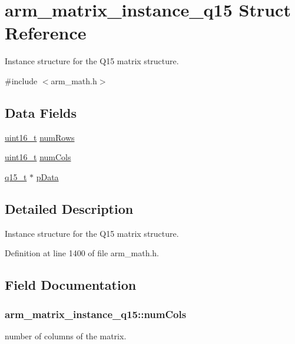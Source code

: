 \hypertarget{structarm__matrix__instance__q15}{\section{arm\-\_\-matrix\-\_\-instance\-\_\-q15 Struct Reference}
\label{structarm__matrix__instance__q15}
}


Instance structure for the Q15 matrix structure.  




{\ttfamily \#include $<$arm\-\_\-math.\-h$>$}

\subsection*{Data Fields}
\begin{DoxyCompactItemize}
\item 
\hyperlink{stdint_8h_a273cf69d639a59973b6019625df33e30}{uint16\-\_\-t} \hyperlink{structarm__matrix__instance__q15_a9bac6ed54be287c4d4f01a1a28be65f5}{num\-Rows}
\item 
\hyperlink{stdint_8h_a273cf69d639a59973b6019625df33e30}{uint16\-\_\-t} \hyperlink{structarm__matrix__instance__q15_acbbce67ba058d8e1c867c71d57288c97}{num\-Cols}
\item 
\hyperlink{arm__math_8h_ab5a8fb21a5b3b983d5f54f31614052ea}{q15\-\_\-t} $\ast$ \hyperlink{structarm__matrix__instance__q15_a6da33a5553e634787d0f515cf8d724af}{p\-Data}
\end{DoxyCompactItemize}


\subsection{Detailed Description}
Instance structure for the Q15 matrix structure. 

Definition at line 1400 of file arm\-\_\-math.\-h.



\subsection{Field Documentation}
\hypertarget{structarm__matrix__instance__q15_acbbce67ba058d8e1c867c71d57288c97}{
\subsubsection[{num\-Cols}]{ arm\-\_\-matrix\-\_\-instance\-\_\-q15\-::num\-Cols}}\label{structarm__matrix__instance__q15_acbbce67ba058d8e1c867c71d57288c97}
number of columns of the matrix. 

